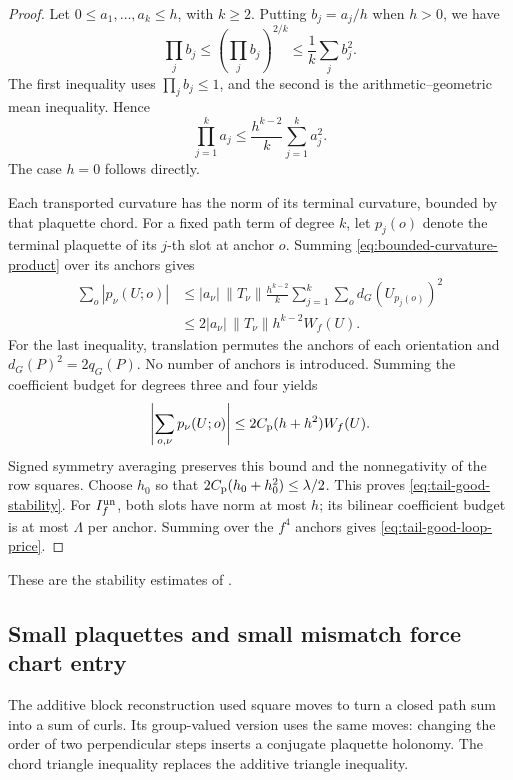 \documentclass[11pt,reqno]{amsart}
\numberwithin{equation}{section}
\theoremstyle{definition}
\theoremstyle{remark}
\begin{document}
\begin{proof}
Let \(0\le a_1,\ldots,a_k\le h\), with \(k\ge2\).
Putting \(b_j=a_j/h\) when \(h>0\), we have
\[
       \prod_j b_j\le\left(\prod_j b_j\right)^{2/k}
                         \le\frac1k\sum_jb_j^2.
\]
The first inequality uses \(\prod_jb_j\le1\), and the second
is the arithmetic--geometric mean inequality. Hence
\begin{equation}
                 \prod_{j=1}^k a_j
                     \le\frac{h^{k-2}}k\sum_{j=1}^k a_j^2.
 \label{eq:bounded-curvature-product}
\end{equation}
The case \(h=0\) follows directly.

Each transported curvature has the norm of its terminal
curvature, bounded by that plaquette chord. For a fixed path
term of degree \(k\), let \(p_j(o)\) denote the terminal plaquette
of its \(j\)-th slot at anchor \(o\). Summing \eqref{eq:bounded-curvature-product}
over its anchors gives
\[
 \begin{split}
       \sum_o|p_\nu(U;o)|
       &\le |a_\nu|\,\|T_\nu\|\frac{h^{k-2}}k
             \sum_{j=1}^k\sum_o
                 d_G(U_{p_j(o)})^2\\
       &\le 2|a_\nu|\,\|T_\nu\|h^{k-2}W_f(U).
 \end{split}
\]
For the last inequality, translation permutes the anchors of
each orientation and \(d_G(P)^2=2q_G(P)\). No number of
anchors is introduced. Summing the coefficient budget for
degrees three and four yields
\[
       \left|\sum_{o,\nu}p_\nu(U;o)\right|
                     \le2C_{\rm p}(h+h^2)W_f(U).
\]
Signed symmetry averaging preserves this bound and the
nonnegativity of the row squares. Choose \(h_0\) so that
\(2C_{\rm p}(h_0+h_0^2)\le\lambda/2\). This proves
\eqref{eq:tail-good-stability}. For \(I_f^{\rm un}\), both slots
have norm at most \(h\); its bilinear coefficient budget is
at most \(\Lambda\) per anchor. Summing over the \(f^4\)
anchors gives \eqref{eq:tail-good-loop-price}.
\end{proof}

These are the stability estimates of
\cite[Lemma~15.2, (15.2)--(15.3), p.~74]{Main}.

\subsection{Small plaquettes and small mismatch force chart entry}

The additive block reconstruction used square moves to turn a
closed path sum into a sum of curls. Its group-valued version
uses the same moves: changing the order of two perpendicular
steps inserts a conjugate plaquette holonomy. The chord triangle
inequality replaces the additive triangle inequality.
\end{document}
